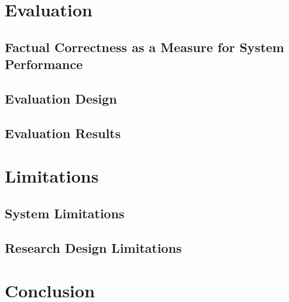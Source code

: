 \documentclass[11pt,a4paper,twoside]{article}
\begin{document}
\cleardoublepage

\section{Evaluation} \label{Eval}

\subsection{Factual Correctness as a Measure for System Performance} \label{EvalFacts}

\subsection{Evaluation Design} \label{EvalDesign}

\subsection{Evaluation Results} \label{EvalResults}


\cleardoublepage

\section{Limitations} \label{Limits}

\subsection{System Limitations} \label{LimitsSystem}

\subsection{Research Design Limitations} \label{LimitsEval}


\cleardoublepage

\section{Conclusion} \label{Conclusion}


\iffalse

\cleardoublepage %
\end{document}
